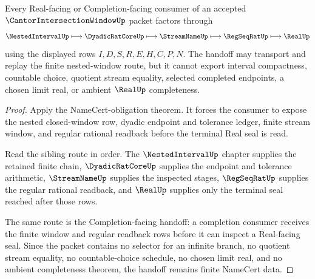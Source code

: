 \begin{theorem}
\label{thm:cantor-intersection-window-real-completion-handoff}
Every Real-facing or Completion-facing consumer of an accepted $\CantorIntersectionWindowUp$ packet factors through
$$
\NestedIntervalUp \longmapsto \DyadicRatCoreUp \longmapsto \StreamNameUp \longmapsto \RegSeqRatUp \longmapsto \RealUp
$$
using the displayed rows $I,D,S,R,E,H,C,P,N$. The handoff may transport and replay the finite nested-window route, but it cannot export interval compactness, countable choice, quotient stream equality, selected completed endpoints, a chosen limit real, or ambient $\RealUp$ completeness.
\end{theorem}
\begin{proof}
Apply the NameCert-obligation theorem. It forces the consumer to expose the nested closed-window row, dyadic endpoint and tolerance ledger, finite stream window, and regular rational readback before the terminal Real seal is read.

Read the sibling route in order. The $\NestedIntervalUp$ chapter supplies the retained finite chain, $\DyadicRatCoreUp$ supplies the endpoint and tolerance arithmetic, $\StreamNameUp$ supplies the inspected stages, $\RegSeqRatUp$ supplies the regular rational readback, and $\RealUp$ supplies only the terminal seal reached after those rows.

The same route is the Completion-facing handoff: a completion consumer receives the finite window and regular readback rows before it can inspect a Real-facing seal. Since the packet contains no selector for an infinite branch, no quotient stream equality, no countable-choice schedule, no chosen limit real, and no ambient completeness theorem, the handoff remains finite NameCert data.
\end{proof}


\begin{closurestatus}{\CantorIntersectionWindowUp}
  \theoryclosure{\seedClosure}
  \formalstatus{\unformalizedV}
\end{closurestatus}
